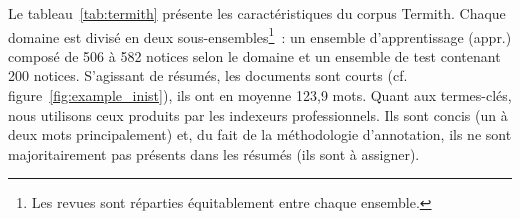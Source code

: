     Le tableau~\ref{tab:termith} présente les caractéristiques du corpus
    Termith. Chaque domaine est divisé en deux sous-ensembles\footnote{Les
    revues sont réparties équitablement entre chaque ensemble.}~: un ensemble
    d'apprentissage (appr.) composé de 506 à 582 notices selon le domaine et un
    ensemble de test contenant 200 notices. S'agissant de résumés, les documents
    sont courts (cf. figure~\ref{fig:example_inist}), ils ont en moyenne 123,9
    mots. Quant aux termes-clés, nous utilisons ceux produits par les indexeurs
    professionnels. Ils sont concis (un à deux mots principalement) et, du fait
    de la méthodologie d'annotation, ils ne sont majoritairement pas présents
    dans les résumés (ils sont \og{}à assigner\fg{}).
    \begin{table}[!h]
      \centering

      \caption{Corpus Termith
               \label{tab:termith}}
    \end{table}

